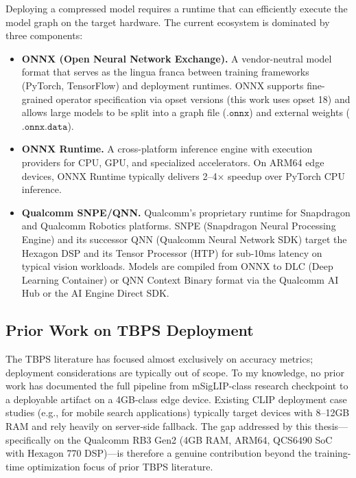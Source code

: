 \documentclass[../main.tex]{subfiles}
\begin{document}
\noindent Deploying a compressed model requires a runtime that can efficiently execute the model graph on the target hardware. The current ecosystem is dominated by three components:

\begin{itemize}
    \item \textbf{ONNX (Open Neural Network Exchange).} A vendor-neutral model format that serves as the lingua franca between training frameworks (PyTorch, TensorFlow) and deployment runtimes. ONNX supports fine-grained operator specification via opset versions (this work uses opset 18) and allows large models to be split into a graph file ($\texttt{.onnx}$) and external weights ($\texttt{.onnx.data}$).
    \item \textbf{ONNX Runtime.} A cross-platform inference engine with execution providers for CPU, GPU, and specialized accelerators. On ARM64 edge devices, ONNX Runtime typically delivers 2--4$\times$ speedup over PyTorch CPU inference.
    \item \textbf{Qualcomm SNPE/QNN.} Qualcomm's proprietary runtime for Snapdragon and Qualcomm Robotics platforms. SNPE (Snapdragon Neural Processing Engine) and its successor QNN (Qualcomm Neural Network SDK) target the Hexagon DSP and its Tensor Processor (HTP) for sub-10ms latency on typical vision workloads. Models are compiled from ONNX to DLC (Deep Learning Container) or QNN Context Binary format via the Qualcomm AI Hub or the AI Engine Direct SDK.
\end{itemize}

\subsection{Prior Work on TBPS Deployment}

\noindent The TBPS literature has focused almost exclusively on accuracy metrics; deployment considerations are typically out of scope. To my knowledge, no prior work has documented the full pipeline from mSigLIP-class research checkpoint to a deployable artifact on a 4GB-class edge device. Existing CLIP deployment case studies (e.g., for mobile search applications) typically target devices with 8--12GB RAM and rely heavily on server-side fallback. The gap addressed by this thesis---specifically on the Qualcomm RB3 Gen2 (4GB RAM, ARM64, QCS6490 SoC with Hexagon 770 DSP)---is therefore a genuine contribution beyond the training-time optimization focus of prior TBPS literature.
\end{document}
